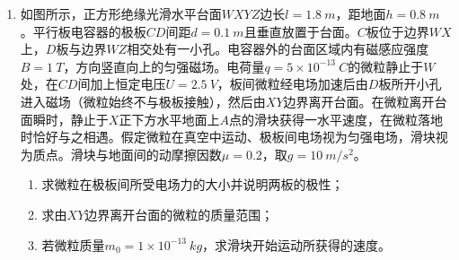 \begin{enumerate}[leftmargin=0em]
{\begin{enumerate}
\end{enumerate}
}



\newpage
\item
{}
如图所示，正方形绝缘光滑水平台面$ WXYZ $边长$ l=1.8\ m $，距地面$ h=0.8\ m $。平行板电容器的极板$ CD $间距$ d=0.1\ m $且垂直放置于台面。$ C $板位于边界$ WX $上，$ D $板与边界$ WZ $相交处有一小孔。电容器外的台面区域内有磁感应强度$ B=1 \ T $，方向竖直向上的匀强磁场。电荷量$ q=5 \times 10^{-13}\ C $的微粒静止于$ W $处，在$ CD $间加上恒定电压$ U=2.5 \ V $，板间微粒经电场加速后由$ D $板所开小孔进入磁场（微粒始终不与极板接触），然后由$ XY $边界离开台面。在微粒离开台面瞬时，静止于$ X $正下方水平地面上$ A $点的滑块获得一水平速度，在微粒落地时恰好与之相遇。假定微粒在真空中运动、极板间电场视为匀强电场，滑块视为质点。滑块与地面间的动摩擦因数$ \mu =0.2 $，取$ g=10 \ m/s ^{2} $。
\begin{enumerate}
\renewcommand{\labelenumi}{\arabic{enumi}.}
\item
求微粒在极板间所受电场力的大小并说明两板的极性；
\item 
求由$ XY $边界离开台面的微粒的质量范围；
\item 
若微粒质量$ m_0=1 \times 10^{-13} \ kg $，求滑块开始运动所获得的速度。



\end{enumerate}
\begin{figure}[h!]
\flushright

\end{figure}





\end{enumerate}
